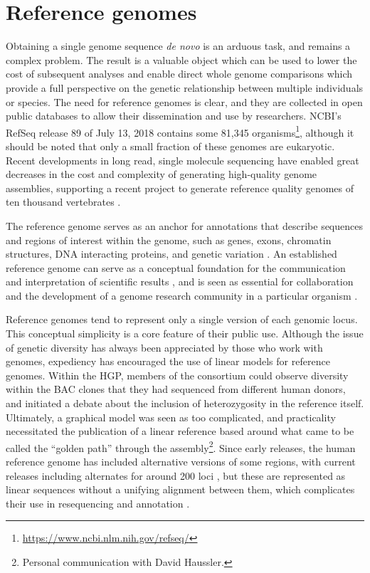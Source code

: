 \documentclass[a4paper,12pt,numbered,oneside]{Classes/PhDThesisPSnPDF}
\providecommand{\DIFaddbegin}{} %
\providecommand{\DIFaddend}{} %
\begin{document}
\section{Reference genomes}
\DIFaddbegin \label{sec:reference_genomes}
\DIFaddend 

Obtaining a single genome sequence \emph{de novo} is an arduous task, and remains a complex problem.
The result is a valuable object which can be used to lower the cost of subsequent analyses and enable direct whole genome comparisons which provide a full perspective on the genetic relationship between multiple individuals or species.
The need for reference genomes is clear, and they are collected in open public databases to allow their dissemination and use by researchers.
NCBI's RefSeq release 89 of July 13, 2018 contains some 81,345 organisms\footnote{\url{https://www.ncbi.nlm.nih.gov/refseq/}}, although it should be noted that only a small fraction of these genomes are eukaryotic.
Recent developments in long read, single molecule sequencing have enabled great decreases in the cost and complexity of generating high-quality genome assemblies, supporting a recent project to generate reference quality genomes of ten thousand vertebrates \cite{genome2009genome,koepfli2015genome}.

The reference genome serves as an anchor for annotations that describe sequences and regions of interest within the genome, such as genes, exons, chromatin structures, DNA interacting proteins, and genetic variation \cite{sherry2001dbsnp,quinlan2010bedtools,encode2012integrated}.
An established reference genome can serve as a conceptual foundation for the communication and interpretation of scientific results \cite{kent2002human}, and is seen as essential for collaboration and the development of a genome research community in a particular organism \cite{smith1998functional,cherry1998sgd}.

Reference genomes tend to represent only a single version of each genomic locus.
This conceptual simplicity is a core feature of their public use.
Although the issue of genetic diversity has always been appreciated by those who work with genomes, expediency has encouraged the use of linear models for reference genomes.
Within the HGP, members of the consortium could observe diversity within the BAC clones that they had sequenced from different human donors, and initiated a debate about the inclusion of heterozygosity in the reference itself.
Ultimately, a graphical model was seen as too complicated, and practicality necessitated the publication of a linear reference based around what came to be called the ``golden path'' through the assembly\footnote{Personal communication with David Haussler.}.
Since early releases, the human reference genome has included alternative versions of some regions, with current releases including alternates for around 200 loci \cite{schneider2017evaluation,church2018genomes}, but these are represented as linear sequences without a unifying alignment between them, which complicates their use in resequencing and annotation \cite{jager2016alternate}.
\end{document}
